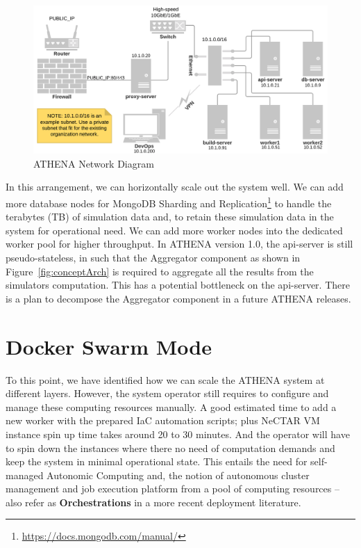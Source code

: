 \begin{figure}[H]
\centering
\includegraphics[width=0.7\paperwidth]{Figures/ATHENA_deploy_network_diagram}
\decoRule
\caption[ATHENA Network Diagram]{ATHENA Network Diagram}
\label{fig:deployNetwork}
\end{figure}

In this arrangement, we can horizontally scale out the system well. We can add more database nodes for MongoDB Sharding and Replication\footnote{\url{https://docs.mongodb.com/manual/}} to handle the terabytes (TB) of simulation data and, to retain these simulation data in the system for operational need. We can add more worker nodes into the dedicated worker pool for higher throughput. In ATHENA version 1.0, the api-server is still pseudo-stateless, in such that the Aggregator component as shown in Figure~\ref{fig:conceptArch} is required to aggregate all the results from the simulators computation. This has a potential bottleneck on the api-server. There is a plan to decompose the Aggregator component in a future ATHENA releases.

\section{Docker Swarm Mode}

To this point, we have identified how we can scale the ATHENA system at different layers. However, the system operator still requires to configure and manage these computing resources manually. A good estimated time to add a new worker with the prepared IaC automation scripts; plus NeCTAR VM instance spin up time takes around 20 to 30 minutes. And the operator will have to spin down the instances where there no need of computation demands and keep the system in minimal operational state. This entails the need for self-managed Autonomic Computing \parencite{1160055} and, the notion of autonomous cluster management and job execution platform from a pool of computing resources -- also refer as \textbf{Orchestrations} in a more recent deployment literature.

